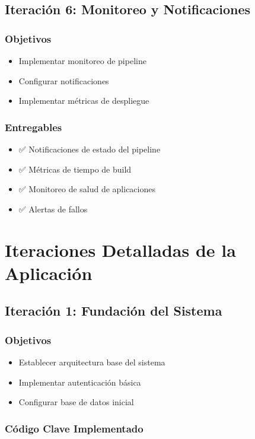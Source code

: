 \documentclass[12pt,a4paper]{article}
\begin{document}
\subsection{Iteración 6: Monitoreo y Notificaciones}

\subsubsection{Objetivos}
\begin{itemize}
    \item Implementar monitoreo de pipeline
    \item Configurar notificaciones
    \item Implementar métricas de despliegue
\end{itemize}

\subsubsection{Entregables}
\begin{itemize}
    \item ✅ Notificaciones de estado del pipeline
    \item ✅ Métricas de tiempo de build
    \item ✅ Monitoreo de salud de aplicaciones
    \item ✅ Alertas de fallos
\end{itemize}

\section{Iteraciones Detalladas de la Aplicación}

\subsection{Iteración 1: Fundación del Sistema}

\subsubsection{Objetivos}
\begin{itemize}
    \item Establecer arquitectura base del sistema
    \item Implementar autenticación básica
    \item Configurar base de datos inicial
\end{itemize}

\subsubsection{Código Clave Implementado}
\end{document}
